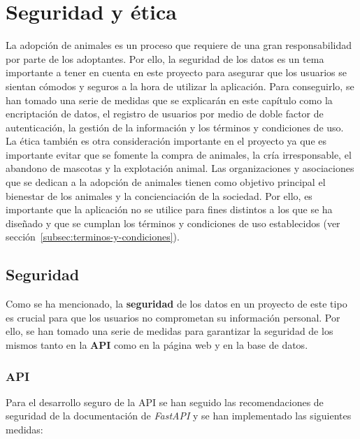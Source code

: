 \chapter{Seguridad y ética}\label{ch:seguridad-y-etica}

La adopción de animales es un proceso que requiere de una gran responsabilidad por parte de los adoptantes. Por ello,
la seguridad de los datos es un tema importante a tener en cuenta en este proyecto para asegurar que los usuarios
se sientan cómodos y seguros a la hora de utilizar la aplicación. Para conseguirlo, se han tomado una serie de medidas
que se explicarán en este capítulo como la encriptación de datos, el registro de usuarios por medio de doble
factor de autenticación, la gestión de la información y los términos y condiciones de uso. \\

La ética también es otra consideración importante en el proyecto ya que es importante evitar que se fomente
la compra de animales, la cría irresponsable, el abandono de mascotas y la explotación animal. Las organizaciones
y asociaciones que se dedican a la adopción de animales tienen como objetivo principal el bienestar de los animales
y la concienciación de la sociedad. Por ello, es importante que la aplicación no se utilice para fines distintos
a los que se ha diseñado y que se cumplan los términos y condiciones de uso establecidos (ver sección~\ref{subsec:terminos-y-condiciones}).

\section{Seguridad}\label{sec:seguridad}

Como se ha mencionado, la \textbf{seguridad} de los datos en un proyecto de este tipo es crucial para que los usuarios no
comprometan su información personal. Por ello, se han tomado una serie de medidas para garantizar la seguridad
de los mismos tanto en la \textbf{API} como en la página web y en la base de datos.

\subsection{API}\label{subsec:api}

Para el desarrollo seguro de la API se han seguido las recomendaciones de seguridad de la documentación de \textit{FastAPI}
y se han implementado las siguientes medidas:

